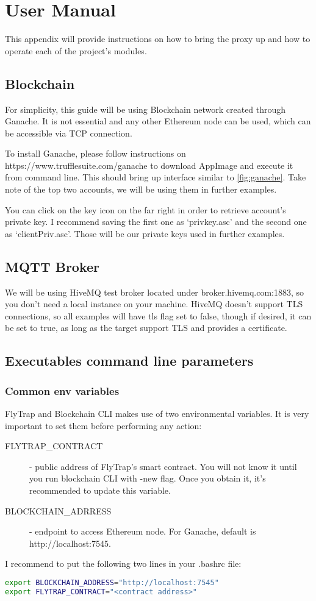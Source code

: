 \chapter{User Manual}
This appendix will provide instructions on how to bring the proxy up and how to operate each of the project's modules.
\section{Blockchain}
For simplicity, this guide will be using Blockchain network created through Ganache. It is not essential and any other Ethereum node can be used, which can be accessible via TCP connection.

To install Ganache, please follow instructions on https://www.trufflesuite.com/ganache to download AppImage and execute it from command line. This should bring up interface similar to \ref{fig:ganache}. Take note of the top two accounts, we will be using them in further examples.

You can click on the key icon on the far right in order to retrieve account's private key. I recommend saving the first one as `privkey.asc' and the second one as `clientPriv.asc'. Those will be our private keys used in further examples.
\section{MQTT Broker}
We will be using HiveMQ test broker located under broker.hivemq.com:1883, so you don't need a local instance on your machine. HiveMQ doesn't support TLS connections, so all examples will have tls flag set to false, though if desired, it can be set to true, as long as the target support TLS and provides a certificate.
\section{Executables command line parameters}
\subsection{Common env variables}\label{sec:envvars}
FlyTrap and Blockchain CLI makes use of two environmental variables. It is very important to set them before performing any action:
\begin{description}
  \item[FLYTRAP\_CONTRACT] - public address of FlyTrap's smart contract. You will not know it until you run blockchain CLI with -new flag. Once you obtain it, it's recommended to update this variable.
  \item[BLOCKCHAIN\_ADRRESS] - endpoint to access Ethereum node. For Ganache, default is http://localhost:7545.
\end{description}
I recommend to put the following two lines in your .bashrc file:
\begin{lstlisting}[language=bash,breaklines=true]
export BLOCKCHAIN_ADDRESS="http://localhost:7545"
export FLYTRAP_CONTRACT="<contract address>"
\end{lstlisting}
